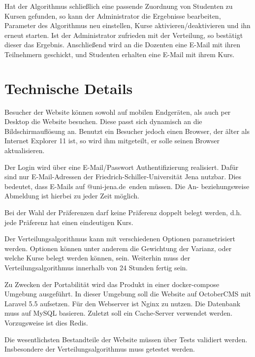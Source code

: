 		Hat der Algorithmus schließlich eine passende Zuordnung von Studenten zu Kursen gefunden, so kann der Administrator die Ergebnisse bearbeiten, Parameter des Algorithmus neu einstellen, Kurse aktivieren/deaktivieren und ihn erneut starten.
		Ist der Administrator zufrieden mit der Verteilung, so bestätigt dieser das Ergebnis.
		Anschließend wird an die Dozenten eine E-Mail mit ihren Teilnehmern geschickt, und Studenten erhalten eine E-Mail mit ihrem Kurs.
		
	\section{Technische Details}
		
		Besucher der Website können sowohl auf mobilen Endgeräten, als auch per Desktop die Website besuchen.
		Diese passt sich dynamisch an die Bildschirmauflösung an.\newline
		Benutzt ein Besucher jedoch einen Browser, der älter als Internet Explorer 11 ist, so wird ihm mitgeteilt, er solle seinen Browser aktualisieren.\newline
		
		Der Login wird über eine E-Mail/Passwort Authentifizierung realisiert.
		Dafür sind nur E-Mail-Adressen der Friedrich-Schiller-Universität Jena nutzbar.
		Dies bedeutet, dass E-Mails auf \glqq @uni-jena.de\grqq~enden müssen.
		Die An- beziehungsweise Abmeldung ist hierbei zu jeder Zeit möglich.\newline
		
		Bei der Wahl der Präferenzen darf keine Präferenz doppelt belegt werden, d.h. jede Präferenz hat einen eindeutigen Kurs. \newline
		
		Der Verteilungsalgorithmus kann mit verschiedenen Optionen parametrisiert werden. Optionen können unter anderem die Gewichtung der Varianz, oder welche Kurse belegt werden können, sein. Weiterhin muss der Verteilungsalgorithmus innerhalb von 24 Stunden fertig sein. \newline
		
		Zu Zwecken der Portabilität wird das Produkt in einer docker-compose Umgebung ausgeführt.
		In dieser Umgebung soll die Website auf OctoberCMS mit Laravel 5.5 aufsetzen.
		Für den Webserver ist Nginx zu nutzen.
		Die Datenbank muss auf MySQL basieren.
		Zuletzt soll ein Cache-Server verwendet werden.
		Vorzugsweise ist dies Redis.\newline
		
		Die wesentlichsten Bestandteile der Website müssen über Tests validiert werden.
		Insbesondere der Verteilungsalgorithmus muss getestet werden.
		
